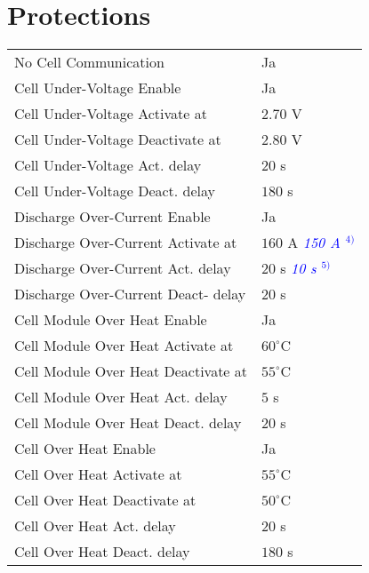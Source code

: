 \section*{Protections}
\begin{tabular}{p{11cm}p{3cm}}
	No Cell Communication & Ja \\
	Cell Under-Voltage Enable & Ja \\
	Cell Under-Voltage Activate at & $2.70$ V \\
	Cell Under-Voltage Deactivate at & $2.80$ V \\
	Cell Under-Voltage Act. delay & $20$ s \\
	Cell Under-Voltage Deact. delay & $180$ s \\
	Discharge Over-Current Enable & Ja \\
	Discharge Over-Current Activate at & $160$ A \textcolor{blue}{\textit{150 A $^{4)}$}} \\
	Discharge Over-Current Act. delay & $20$ s \textcolor{blue}{\textit{10 s $^{5)}$}}\\
	Discharge Over-Current Deact- delay & $20$ s \\
	Cell Module Over Heat Enable & Ja \\
	Cell Module Over Heat Activate at & $60^\circ$C \\
	Cell Module Over Heat Deactivate at & $55^\circ$C \\
	Cell Module Over Heat Act. delay & $5$ s \\
	Cell Module Over Heat Deact. delay & $20$ s \\
	Cell Over Heat Enable & Ja \\
	Cell Over Heat Activate at & $55^\circ$C \\
	Cell Over Heat Deactivate at & $50^\circ$C \\
	Cell Over Heat Act. delay & $20$ s \\
	Cell Over Heat Deact. delay & $180$ s
\end{tabular}

